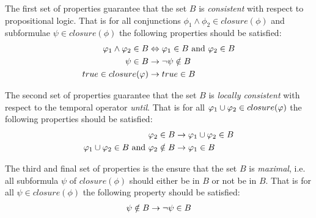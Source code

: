 The first set of properties guarantee that the set $B$ is \emph{consistent} with respect to propositional logic. That is for all conjunctions $\phi_1 \land \phi_2 \in closure(\phi)$ and subformulae $\psi \in closure(\phi)$ the following properties should be satisfied:
\begin{align}
    \varphi_1 \land \varphi_2 \in B &\Leftrightarrow \varphi_1 \in B \text{ and } \varphi_2 \in B \label{eq:elem1.1} \\
    \psi \in B &\rightarrow \lnot \psi \notin B \label{eq:elem1.2} \\
    true \in closure(\varphi) &\rightarrow true \in B \label{eq:elem1.3}
\end{align}

The second set of properties guarantee that the set $B$ is \emph{locally consistent} with respect to the temporal operator \emph{until}. That is for all $\varphi_1 \cup \varphi_2 \in closure(\varphi)$ the following properties should be satisfied:
\begin{align}
    \varphi_2 \in B &\rightarrow \varphi_1 \cup \varphi_2 \in B \label{eq:elem2.1} \\
    \varphi_1 \cup \varphi_2 \in B \text{ and } \varphi_2 \notin B &\rightarrow \varphi_1 \in B \label{eq:elem2.2}
\end{align}

The third and final set of properties is the ensure that the set $B$ is \emph{maximal}, i.e. all subformula $\psi$ of $closure(\phi)$ should either be in $B$ or not be in $B$. That is for all $\psi \in closure(\phi)$ the following property should be satisfied:
\begin{align}
    \psi \notin B \rightarrow \lnot \psi \in B \label{eq:elem3.1}
\end{align}

